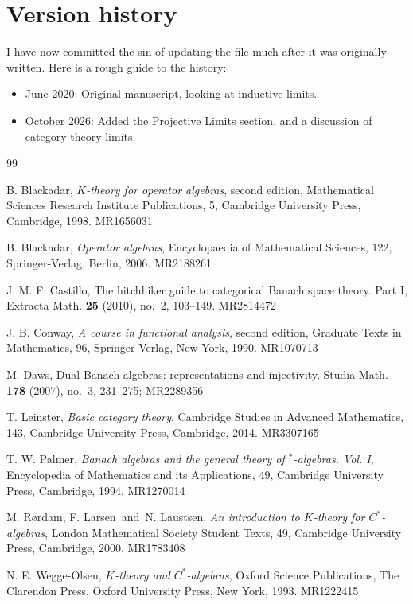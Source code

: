 \documentclass[a4paper,11pt]{article}
\theoremstyle{definition}
\begin{document}
\section{Version history}

I have now committed the sin of updating the file much after it was originally written.  Here is a rough guide to the history:
\begin{itemize}
    \item June 2020: Original manuscript, looking at inductive limits.
    \item October 2026: Added the Projective Limits section, and a discussion of category-theory limits.
\end{itemize}




\begin{thebibliography}{99}

 B. Blackadar, {\it $K$-theory for operator algebras}, second edition, Mathematical Sciences Research Institute Publications, 5, Cambridge University Press, Cambridge, 1998. MR1656031

 B. Blackadar, {\it Operator algebras}, Encyclopaedia of Mathematical Sciences, 122, Springer-Verlag, Berlin, 2006. MR2188261

 J. M. F. Castillo, The hitchhiker guide to categorical Banach space theory. Part I, Extracta Math. {\bf 25} (2010), no.~2, 103--149. MR2814472

 J. B. Conway, {\it A course in functional analysis}, second edition, Graduate Texts in Mathematics, 96, Springer-Verlag, New York, 1990. MR1070713

 M. Daws, Dual Banach algebras: representations and injectivity, Studia Math. {\bf 178} (2007), no.~3, 231--275; MR2289356

 T. Leinster, {\it Basic category theory}, Cambridge Studies in Advanced Mathematics, 143, Cambridge University Press, Cambridge, 2014. MR3307165

 T. W. Palmer, {\it Banach algebras and the general theory of $^*$-algebras. Vol. I}, Encyclopedia of Mathematics and its Applications, 49, Cambridge University Press, Cambridge, 1994. MR1270014

 M. R\o rdam, F. Larsen\ and\ N. Laustsen, {\it An introduction to $K$-theory for $C^*$-algebras}, London Mathematical Society Student Texts, 49, Cambridge University Press, Cambridge, 2000. MR1783408

 N. E. Wegge-Olsen, {\it $K$-theory and $C^*$-algebras}, Oxford Science Publications, The Clarendon Press, Oxford University Press, New York, 1993. MR1222415

\end{thebibliography}
\end{document}
